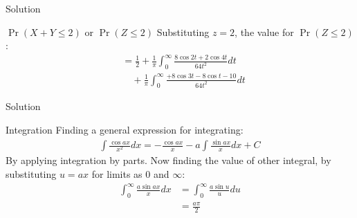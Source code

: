 \documentclass{beamer}
\providecommand{\pr}[1]{\ensuremath{\Pr\left(#1\right)}}
\begin{document}
\begin{frame}{Solution}
    \begin{block}{$\pr{X+Y \leq 2}$ or $\pr{Z\leq 2}$}
    Substituting $z=2$, the value for $\pr{Z\leq 2}$:
\begin{align}
\nonumber
    &=\frac{1}{2}+\frac{1}{\pi}\int_0^\infty \frac{8\cos{2t}+2\cos{4t}}{64t^2}dt\\
    &\quad+\frac{1}{\pi}\int_0^\infty\frac{+8\cos{3t}-8\cos{t}-10}{64t^2}dt\label{first_sub}
\end{align}
    \end{block}
\end{frame}
\begin{frame}{Solution}
\begin{block}{Integration}
Finding a general expression for integrating:
\begin{align}
    \int \frac{\cos{ax}}{x^2}dx=-\frac{\cos{ax}}{x}-a\int\frac{\sin{ax}}{x}dx + C\label{gen1}
\end{align}
By applying integration by parts. Now finding the value of other integral, by substituting $u=ax$ for limits as $0$ and $\infty$:
\begin{align}
    \int_0^\infty\frac{a\sin{ax}}{x}dx &= \int_0^\infty\frac{a\sin{u}}{u}du\\
    &=\frac{a\pi}{2}\label{gen2}
\end{align}
\end{block}
\end{frame}
\end{document}
